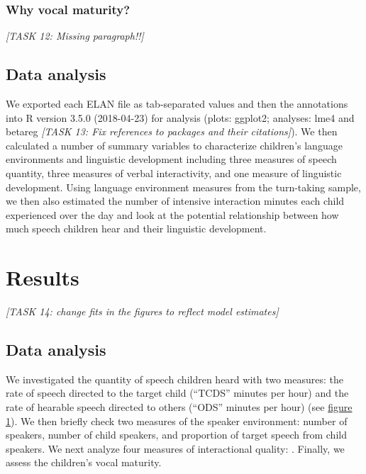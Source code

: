 \documentclass[floatsintext,man]{apa6}
\theoremstyle{definition}
\theoremstyle{definition}
\theoremstyle{definition}
\theoremstyle{remark}
\begin{document}
\subsubsection{Why vocal maturity?}\label{why-vocal-maturity}

\emph{{[}TASK 12: Missing paragraph!!{]}}

\subsection{Data analysis}\label{methods-analysisinfo}

We exported each ELAN file as tab-separated values and then the
annotations into R version 3.5.0 (2018-04-23) for analysis (plots:
ggplot2; analyses: lme4 and betareg \emph{{[}TASK 13: Fix references to
packages and their citations{]}}). We then calculated a number of
summary variables to characterize children's language environments and
linguistic development including three measures of speech quantity,
three measures of verbal interactivity, and one measure of linguistic
development. Using language environment measures from the turn-taking
sample, we then also estimated the number of intensive interaction
minutes each child experienced over the day and look at the potential
relationship between how much speech children hear and their linguistic
development.

\section{Results}\label{results}

\emph{{[}TASK 14: change fits in the figures to reflect model
estimates{]}}

\subsection{Data analysis}\label{data-analysis}

We investigated the quantity of speech children heard with two measures:
the rate of speech directed to the target child (\enquote{TCDS} minutes
per hour) and the rate of hearable speech directed to others
(\enquote{ODS} minutes per hour) (see \protect\hyperlink{fig1}{figure
1}). We then briefly check two measures of the speaker environment:
number of speakers, number of child speakers, and proportion of target
speech from child speakers. We next analyze four measures of
interactional quality: . Finally, we assess the children's vocal
maturity.
\end{document}
